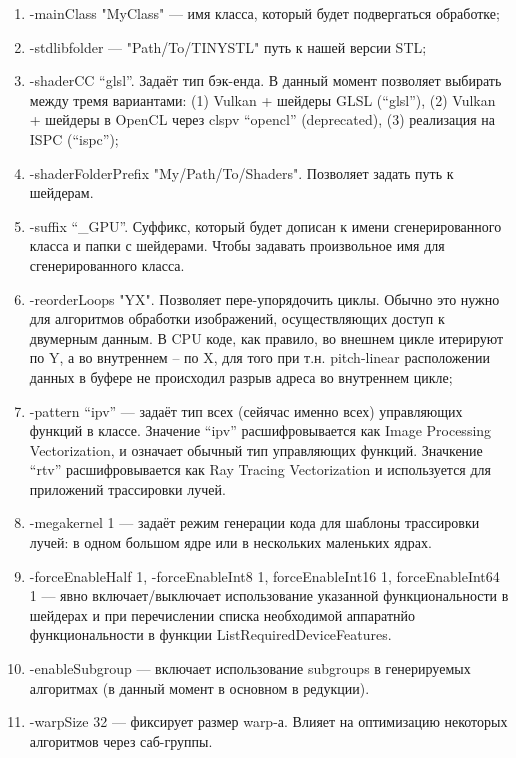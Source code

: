 \documentclass[11pt,fleqn,english,russian]{report} %
\begin{document}
\begin{enumerate}
\item -mainClass "MyClass" --- имя класса, который будет подвергаться обработке;
\item -stdlibfolder --- "Path/To/TINYSTL" путь к нашей версии STL;

\item -shaderCC ``glsl''. Задаёт тип бэк-енда. В данный момент позволяет выбирать между тремя вариантами: (1) Vulkan + шейдеры GLSL (``glsl''), (2) Vulkan + шейдеры в OpenCL через clspv ``opencl'' (deprecated), (3) реализация на ISPC (``ispc''); 

\item -shaderFolderPrefix "My/Path/To/Shaders". Позволяет задать путь к шейдерам. 

\item -suffix ``\_GPU''. Суффикс, который будет дописан к имени сгенерированного класса и папки с шейдерами. Чтобы задавать произвольное имя для сгенерированного класса.

\item -reorderLoops "YX". Позволяет пере-упорядочить циклы. Обычно это нужно для алгоритмов обработки изображений, осуществляющих доступ к двумерным данным. В CPU коде, как правило, во внешнем цикле итерируют по Y, а во внутреннем -- по X, для того при т.н. pitch-linear расположении данных в буфере не происходил  разрыв адреса во внутреннем цикле;

\item -pattern ``ipv'' --- задаёт тип всех (сейячас именно всех) управляющих функций в классе. Значение ``ipv'' расшифровывается как Image Processing Vectorization, и означает обычный тип управляющих функций. Значкение ``rtv'' расшифровывается как Ray Tracing Vectorization и используется для приложений трассировки лучей.

\item -megakernel 1 --- задаёт режим генерации кода для шаблоны трассировки лучей: в одном большом ядре или в нескольких маленьких ядрах.

\item -forceEnableHalf 1, -forceEnableInt8 1, forceEnableInt16 1, forceEnableInt64 1 --- явно включает/выключает использование указанной функциональности в шейдерах и при перечислении списка необходимой аппаратнйо функциональности в функции ListRequiredDeviceFeatures.

\item -enableSubgroup --- включает использование subgroups в генерируемых алгоритмах (в данный момент в основном в редукции).

\item -warpSize 32 --- фиксирует размер warp-а. Влияет на оптимизацию некоторых алгоритмов через саб-группы.

\end{enumerate}
\end{document}
